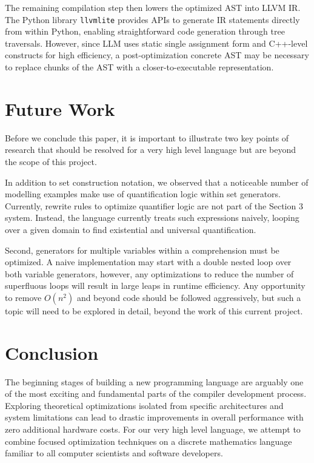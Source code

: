 \documentclass{article}
\begin{document}
The remaining compilation step then lowers the optimized AST into LLVM IR. The Python library \texttt{llvmlite} \cite{llvmliteLib} provides APIs to generate IR statements directly from within Python, enabling straightforward code generation through tree traversals. However, since LLM uses static single assignment form and C++-level constructs for high efficiency, a post-optimization concrete AST may be necessary to replace chunks of the AST with a closer-to-executable representation.


\section{Future Work}

Before we conclude this paper, it is important to illustrate two key points of research that should be resolved for a very high level language but are beyond the scope of this project.

In addition to set construction notation, we observed that a noticeable number of modelling examples make use of quantification logic within set generators. Currently, rewrite rules to optimize quantifier logic are not part of the Section 3 system. Instead, the language currently treats such expressions naively, looping over a given domain to find existential and universal quantification.

Second, generators for multiple variables within a comprehension must be optimized. A naive implementation may start with a double nested loop over both variable generators, however, any optimizations to reduce the number of superfluous loops will result in large leaps in runtime efficiency. Any opportunity to remove $O(n^2)$ and beyond code should be followed aggressively, but such a topic will need to be explored in detail, beyond the work of this current project.


\section{Conclusion}
The beginning stages of building a new programming language are arguably one of the most exciting and fundamental parts of the compiler development process. Exploring theoretical optimizations isolated from specific architectures and system limitations can lead to drastic improvements in overall performance with zero additional hardware costs. For our very high level language, we attempt to combine focused optimization techniques on a discrete mathematics language familiar to all computer scientists and software developers.


\pagebreak
\nocite{*} %
\printbibliography %
\end{document}
